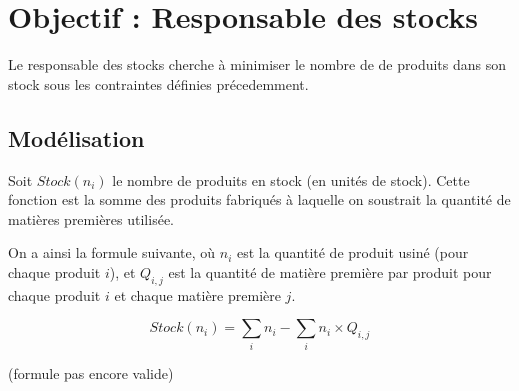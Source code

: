 \newpage
\section{Objectif : Responsable des stocks}
Le responsable des stocks cherche à minimiser le nombre de de produits dans
son stock sous les contraintes définies précedemment.

\subsection{Modélisation}
Soit $Stock(n_{i})$ le nombre de produits en stock (en unités de stock). Cette
fonction est la somme des produits fabriqués à laquelle on soustrait la quantité
de matières premières utilisée.

On a ainsi la formule suivante, où $n_{i}$ est la quantité de produit usiné
(pour chaque produit $i$), et $Q_{i,j}$ est la quantité de matière première par
produit pour chaque produit $i$ et chaque matière première $j$.
 
\begin{equation}
	Stock(n_{i}) = \sum_{i} n_{i} - \sum_{i} n_{i} \times Q_{i,j}
\end{equation}

(formule pas encore valide) 